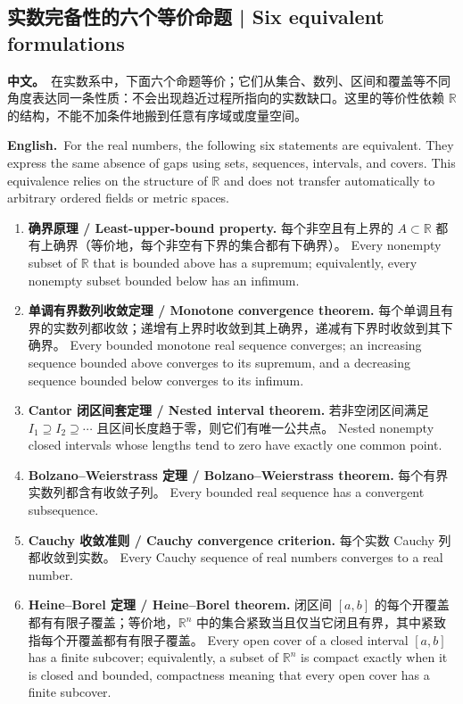 \documentclass[UTF8,11pt,a4paper]{ctexart}
\newcommand{\BOTH}[2]{\par\noindent\textbf{中文。}\ #1\par\noindent\textbf{English.}\ #2\par}
\begin{document}
\subsection{实数完备性的六个等价命题 | Six equivalent formulations}
\BOTH{在实数系中，下面六个命题等价；它们从集合、数列、区间和覆盖等不同角度表达同一条性质：不会出现趋近过程所指向的实数缺口。这里的等价性依赖 $\mathbb R$ 的结构，不能不加条件地搬到任意有序域或度量空间。}{For the real numbers, the following six statements are equivalent. They express the same absence of gaps using sets, sequences, intervals, and covers. This equivalence relies on the structure of $\mathbb R$ and does not transfer automatically to arbitrary ordered fields or metric spaces.}
\begin{enumerate}[label=(\arabic*)]
\item \textbf{确界原理 / Least-upper-bound property.} 每个非空且有上界的 $A\subset\mathbb R$ 都有上确界（等价地，每个非空有下界的集合都有下确界）。 Every nonempty subset of $\mathbb R$ that is bounded above has a supremum; equivalently, every nonempty subset bounded below has an infimum.
\item \textbf{单调有界数列收敛定理 / Monotone convergence theorem.} 每个单调且有界的实数列都收敛；递增有上界时收敛到其上确界，递减有下界时收敛到其下确界。 Every bounded monotone real sequence converges; an increasing sequence bounded above converges to its supremum, and a decreasing sequence bounded below converges to its infimum.
\item \textbf{Cantor 闭区间套定理 / Nested interval theorem.} 若非空闭区间满足 $I_1\supseteq I_2\supseteq\cdots$ 且区间长度趋于零，则它们有唯一公共点。 Nested nonempty closed intervals whose lengths tend to zero have exactly one common point.
\item \textbf{Bolzano--Weierstrass 定理 / Bolzano--Weierstrass theorem.} 每个有界实数列都含有收敛子列。 Every bounded real sequence has a convergent subsequence.
\item \textbf{Cauchy 收敛准则 / Cauchy convergence criterion.} 每个实数 Cauchy 列都收敛到实数。 Every Cauchy sequence of real numbers converges to a real number.
\item \textbf{Heine--Borel 定理 / Heine--Borel theorem.} 闭区间 $[a,b]$ 的每个开覆盖都有有限子覆盖；等价地，$\mathbb R^n$ 中的集合紧致当且仅当它闭且有界，其中紧致指每个开覆盖都有有限子覆盖。 Every open cover of a closed interval $[a,b]$ has a finite subcover; equivalently, a subset of $\mathbb R^n$ is compact exactly when it is closed and bounded, compactness meaning that every open cover has a finite subcover.
\end{enumerate}
\end{document}
